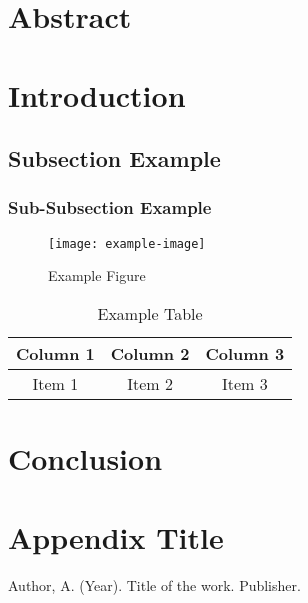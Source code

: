 \documentclass[12pt]{article}
\begin{document}
\listoftables
\pagebreak

\listoffigures
\pagebreak

\section*{Abstract}
\lipsum[1] %

\section{Introduction}
\lipsum[2-3] %

\subsection{Subsection Example}
\lipsum[4]

\subsubsection{Sub-Subsection Example}
\lipsum[5]

\begin{figure}[H]
    \centering
    \texttt{[image: example-image]}
    \caption{Example Figure}
    \label{fig:example}
\end{figure}

\begin{table}[H]
    \centering
    \begin{tabular}{|c|c|c|}
        \hline
        Column 1 & Column 2 & Column 3 \\
        \hline
        Item 1 & Item 2 & Item 3 \\
        \hline
    \end{tabular}
    \caption{Example Table}
    \label{tab:example}
\end{table}

\section{Conclusion}
\lipsum[6] %

\appendix
\section{Appendix Title}
\lipsum[7] %

\begin{thebibliography}{99}
 Author, A. (Year). Title of the work. Publisher.
\end{thebibliography}
\end{document}
